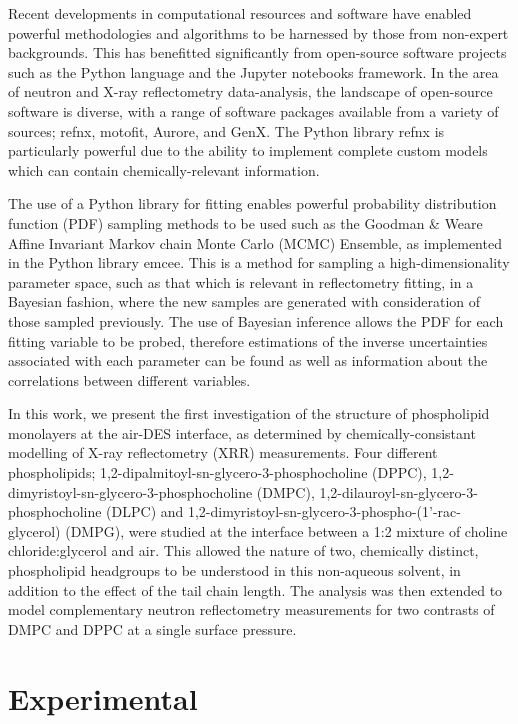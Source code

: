 \documentclass[twoside,twocolumn,9pt]{article}
\begin{document}
Recent developments in computational resources and software have enabled powerful methodologies and algorithms to be harnessed by those from non-expert backgrounds. This has benefitted significantly from open-source software projects such as the Python language\cite{vanRossum1995} and the Jupyter notebooks framework.\cite{Kluyver2016} In the area of neutron and X-ray reflectometry data-analysis, the landscape of open-source software is diverse, with a range of software packages available from a variety of sources; refnx\cite{Nelson2018}, motofit,\cite{Nelson2006} Aurore,\cite{Gerelli2016} and GenX.\cite{Bjorck2007} The Python library refnx is particularly powerful due to the ability to implement complete custom models which can contain chemically-relevant information.

The use of a Python library for fitting enables powerful probability distribution function (PDF) sampling methods to be used such as the Goodman \& Weare Affine Invariant Markov chain Monte Carlo (MCMC) Ensemble,\cite{Goodman2010} as implemented in the Python library emcee.\cite{Foreman-Mackey2013} This is a method for sampling a high-dimensionality parameter space, such as that which is relevant in reflectometry fitting, in a Bayesian fashion, where the new samples are generated with consideration of those sampled previously. The use of Bayesian inference allows the PDF for each fitting variable to be probed, therefore estimations of the inverse uncertainties associated with each parameter can be found as well as information about the correlations between different variables. 

In this work, we present the first investigation of the structure of phospholipid monolayers at the air-DES interface, as determined by chemically-consistant modelling of X-ray reflectometry (XRR) measurements. Four different phospholipids; 1,2-dipalmitoyl-sn-glycero-3-phosphocholine (DPPC), 1,2-dimyristoyl-sn-glycero-3-phosphocholine (DMPC),  1,2-dilauroyl-sn-glycero-3-phosphocholine (DLPC) and 1,2-dimyristoyl-sn-glycero-3-phospho-(1'-rac-glycerol) (DMPG), were studied at the interface between a 1:2 mixture of choline chloride:glycerol and air. This allowed the nature of two, chemically distinct, phospholipid headgroups to be understood in this non-aqueous solvent, in addition to the effect of the tail chain length. The analysis was then extended to model complementary neutron reflectometry measurements for two contrasts of DMPC and DPPC at a single surface pressure. 

\section{Experimental}
\end{document}
